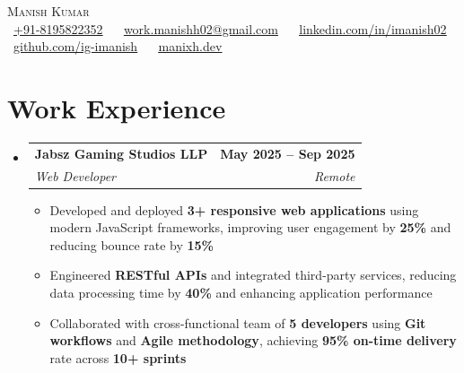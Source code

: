 \documentclass[letterpaper,11pt]{article}
\makeatletter
\newcommand{\resumeItem}[1]{
  \item\small{
    {#1 \vspace{0pt}}
  }
}
\newcommand{\resumeSubheading}[4]{
  \vspace{-2pt}\item
    \begin{tabular*}{1.0\textwidth}[t]{l@{\extracolsep{\fill}}r}
      \textbf{#1} & \textbf{\small #2} \\
      \textit{\small#3} & \textit{\small #4} \\
    \end{tabular*}\vspace{-7pt}
}
\newcommand{\resumeSubHeadingListStart}{\begin{itemize}[leftmargin=0.0in, label={}]}
\newcommand{\resumeSubHeadingListEnd}{\end{itemize}}\vspace{0pt}
\newcommand{\resumeItemListStart}{\begin{itemize}}
\newcommand{\resumeItemListEnd}{\end{itemize}\vspace{-5pt}}
\makeatother
\begin{document}
\begin{center}
    {\Large \scshape Manish Kumar} \\[3mm]
    \footnotesize \raisebox{-0.1\height}
    \faPhone\ \underline{+91-8195822352} ~
    \faEnvelope\ \underline{work.manishh02@gmail.com} ~
    \faLinkedin\ \underline{\href{https://www.linkedin.com/in/imanish02}{linkedin.com/in/imanish02}} ~
    \faGithub\ \underline{\href{https://github.com/ig-imanish}{github.com/ig-imanish}} ~
    \faBriefcase\ \underline{\href{https://manixh.dev}{manixh.dev}}
    \vspace{-8pt}
\end{center}

\section{Work Experience}
    \resumeSubHeadingListStart
        \resumeSubheading{Jabsz Gaming Studios LLP}{May 2025 -- Sep 2025}{Web Developer}{Remote}
        \resumeItemListStart
            \resumeItem{Developed and deployed \textbf{3+ responsive web applications} using modern JavaScript frameworks, improving user engagement by \textbf{25\%} and reducing bounce rate by \textbf{15\%}}
            \resumeItem{Engineered \textbf{RESTful APIs} and integrated third-party services, reducing data processing time by \textbf{40\%} and enhancing application performance}
            \resumeItem{Collaborated with cross-functional team of \textbf{5 developers} using \textbf{Git workflows} and \textbf{Agile methodology}, achieving \textbf{95\% on-time delivery} rate across \textbf{10+ sprints}}
        \resumeItemListEnd
    \resumeSubHeadingListEnd
    \vspace{-12pt}

\end{document}
